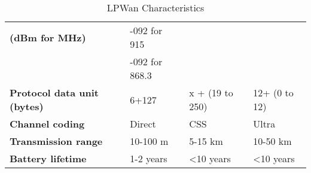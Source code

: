 \begin{table}[h!]
\begin{center}
\begin{tabular}{l|l|l|l}
	\bf{\footnotesize{(dBm for MHz)}}              & -092 for 915   &                                 & \\
	\                                              & -092 for 868.3 &                                 & \\\hline
	\bf{Protocol data unit \footnotesize{(bytes)}} & 6+127          & x + (19 to 250)                 & 12+ (0 to 12)\\\hline
	\bf{Channel coding}                            & Direct         & CSS                             & Ultra        \\\hline
	\bf{Transmission range}                        & 10-100 m       & 5-15 km                         & 10-50 km     \\\hline
	\bf{Battery lifetime}                          & 1-2 years      & <10 years                       & <10 years    \\\hline
	\end{tabular}
	\caption{\label{tab:Table54975} LPWan Characteristics \cite{al-kashoash_comparison_2016}}
\end{center}
\end{table}


